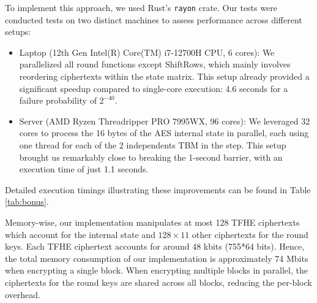 To implement this approach, we used Rust's \texttt{rayon} crate. Our tests were conducted tests on two distinct machines to assess performance across different setups:
\begin{itemize}
\item Laptop (12th Gen Intel(R) Core(TM) i7-12700H CPU, 6 cores): We parallelized all round functions except ShiftRows, which mainly involves reordering ciphertexts within the state matrix. This setup already provided a significant speedup compared to single-core execution: 4.6 seconds for a failure probability of $2^{-40}$.
\item Server (AMD Ryzen Threadripper PRO 7995WX, 96 cores): We leveraged 32 cores to process the 16 bytes of the AES internal state in parallel, each using one thread for each of the 2 independents TBM in the \SubBytes step. This setup brought us remarkably close to breaking the 1-second barrier, with an execution time of just 1.1 seconds.
\end{itemize}
%
%
%
Detailed execution timings illustrating these improvements can be found in Table \ref{tab:bonus}.


 Memory-wise, our implementation manipulates at most 128 TFHE ciphertexts which account for the internal state and $128 \times 11$ other ciphertexts for the round keys. Each TFHE ciphertext accounts for around 48 kbits (755*64 bits). Hence, the total memory consumption of our implementation is approximately 74 Mbits when encrypting a single block. When encrypting multiple blocks in parallel, the ciphertexts for the round keys are shared across all blocks, reducing the per-block overhead.



